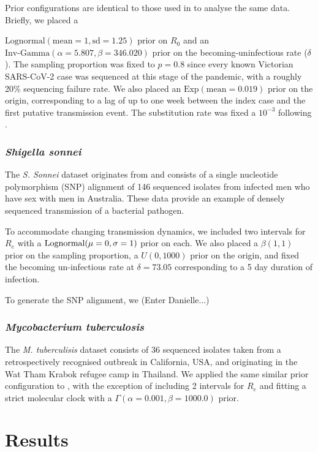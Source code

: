 \documentclass{article}
\begin{document}
\begin{spacing}{1.5}
Prior configurations are identical to those used in \citet{featherstone_decoding_2023} to analyse the same data. Briefly, we placed a 

$\textrm{Lognormal}(\textrm{mean}=1, \textrm{sd}=1.25)$ prior on $R_0$ and an $\textrm{Inv-Gamma}(\alpha=5.807, \beta=346.020)$ prior on the becoming-uninfectious rate ($\delta$).  The sampling proportion was fixed to $p=0.8$ since every known Victorian SARS-CoV-2 case was sequenced at this stage of the pandemic, with a roughly 20\% sequencing failure rate. We also placed an $\textrm{Exp}(\textrm{mean}=0.019)$ prior on the origin, corresponding to a lag of up to one week  between the index case and the first putative transmission event. The substitution rate was fixed a $10^{-3}$ following \citep{duchene_temporal_2020}.

\subsubsection*{\textit{Shigella sonnei}}
The \textit{S. Sonnei} dataset originates from \citet{ingle_co-circulation_2019} and consists of a single nucleotide polymorphism (SNP) alignment of 146 sequenced isolates from infected men who have sex with men in Australia. These data provide an example of densely sequenced transmission of a bacterial pathogen. 

To accommodate changing transmission dynamics, we included two intervals for $R_e$ with a $\textnormal{Lognormal}(\mu=0,\sigma=1)$ prior on each. We also placed a $\beta(1,1)$ prior on the sampling proportion, a $U(0,1000)$ prior on the origin, and fixed the becoming un-infectious rate at $\delta=73.05$ corresponding to a 5 day duration of infection.

To generate the SNP alignment, we (Enter Danielle...)

\subsubsection*{\textit{Mycobacterium tuberculosis}}
The \textit{M. tuberculisis} dataset consists of 36 sequenced isolates taken from a retrospectively recognised outbreak in California, USA, and originating in the Wat Tham Krabok refugee camp in Thailand. We applied the same similar prior configuration to \citet{kuhnert_tuberculosis_2018}, with the exception of including 2 intervals for $R_e$ and fitting a strict molecular clock with a $\Gamma(\alpha=0.001,\beta=1000.0)$ prior.


\section*{Results}

\end{spacing}
\end{document}
